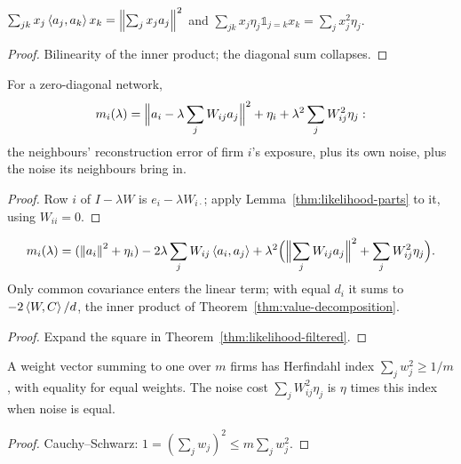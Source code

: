 \begin{lemma}\label{thm:likelihood-parts}
  \leanok
  $\sum_{jk}x_j\left\langle a_j,a_k\right\rangle x_k=\left\lVert\sum_jx_ja_j\right\rVert^2$ and
  $\sum_{jk}x_j\eta_j\mathbb 1_{j=k}x_k=\sum_jx_j^2\eta_j$.
\end{lemma}
\begin{proof}\leanok
  Bilinearity of the inner product; the diagonal sum collapses.
\end{proof}

\begin{theorem}\label{thm:likelihood-filtered}
  \leanok
  For a zero-diagonal network,
  \[
    m_i(\lambda)=\Bigl\lVert a_i-\lambda\sum_jW_{ij}a_j\Bigr\rVert^2+\eta_i
    +\lambda^2\sum_jW_{ij}^2\eta_j :
  \]
  the neighbours' reconstruction error of firm $i$'s exposure, plus its own
  noise, plus the noise its neighbours bring in.
\end{theorem}
\begin{proof}\leanok
  Row $i$ of $I-\lambda W$ is $e_i-\lambda W_{i\cdot}$; apply
  Lemma~\ref{thm:likelihood-parts} to it, using $W_{ii}=0$.
\end{proof}

\begin{corollary}\label{thm:likelihood-expand}
  \leanok
  \[
    m_i(\lambda)=(\left\lVert a_i\right\rVert^2+\eta_i)-2\lambda\sum_jW_{ij}\left\langle a_i,a_j\right\rangle
    +\lambda^2\Bigl(\Bigl\lVert\sum_jW_{ij}a_j\Bigr\rVert^2+\sum_jW_{ij}^2\eta_j\Bigr).
  \]
  Only common covariance enters the linear term; with equal $d_i$ it sums to
  $-2\left\langle W,C\right\rangle/d$, the inner product of Theorem~\ref{thm:value-decomposition}.
\end{corollary}
\begin{proof}\leanok
  Expand the square in Theorem~\ref{thm:likelihood-filtered}.
\end{proof}

\begin{lemma}\label{thm:likelihood-herfindahl}
  \leanok
  A weight vector summing to one over $m$ firms has Herfindahl index
  $\sum_jw_j^2\ge1/m$, with equality for equal weights. The noise cost
  $\sum_jW_{ij}^2\eta_j$ is $\eta$ times this index when noise is equal.
\end{lemma}
\begin{proof}\leanok
  Cauchy--Schwarz: $1=(\sum_jw_j)^2\le m\sum_jw_j^2$.
\end{proof}

